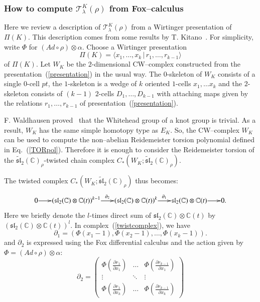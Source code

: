 \documentclass[a4paper]{amsart}
\theoremstyle{plain}
\theoremstyle{definition}
\theoremstyle{remark}
\newcommand{\C}{{\mathbb C}}
\newcommand{\CC}{{\mathbb C}}
\newcommand{\T}{\mathcal{T}}
\newcommand{\sll}{\mathfrak{sl}_2(\CC)}
\newcommand{\tsll}{\widetilde{\mathfrak{sl}}_2(\CC)}
\begin{document}
\subsubsection*{How to compute $\T^K_{\lambda}(\rho)$ from Fox--calculus} 
Here we review a description of $\T^K_{\lambda}(\rho)$ from a Wirtinger presentation of $\Pi(K)$. This description comes from some results by T. Kitano~\cite{Kitano}.
For simplicity, write $\Phi$ for $(Ad \circ \rho) \otimes \alpha$.
Choose a Wirtinger presentation
\begin{equation}\label{presentation}
\Pi(K)
=
\langle x_1, \ldots, x_k \,|\, r_1,\ldots, r_{k-1} \rangle
\end{equation}
of $\Pi(K)$.
Let $W_K$ be the $2$-dimensional CW--complex constructed from the presentation~(\ref{presentation}) in the usual way. The $0$-skeleton of $W_K$ consists of a single $0$-cell $pt$, the $1$-skeleton is a wedge of
$k$ oriented $1$-cells $x_1, \ldots x_k$ and the $2$-skeleton consists of $(k-1)$ $2$-cells $D_1, \ldots, D_{k-1}$ with
attaching maps given by the relations $r_1, \ldots, r_{k-1}$ of presentation~(\ref{presentation}).

 F. Waldhausen proved~\cite{W} that the Whitehead 
group of a knot group is trivial. As a result, $W_K$ has the same simple 
homotopy type as $E_K$. So, the CW--complex $W_K$ can be used to compute  the non--abelian Reidemeister torsion polynomial defined in Eq.~(\ref{TORpol}). 
Therefore it is enough to consider the Reidemeister torsion of the $\tsll_\rho$-twisted chain complex $C_*\left(W_K;\tsll_\rho\right)$.

The twisted complex $C_*(W_K;\tsll_\rho)$ thus becomes:
\begin{equation}\label{twistcomplex}
\xymatrix@1@-.5pc{0 \ar[r] &  {\left({\sll\otimes \C(t)}\right)}_{}^{k-1} 
\ar[r]^-{\partial_2} &  {\left({\sll \otimes \C(t)}\right)}_{}^k 
\ar[r]^-{\partial_1}& \sll \otimes \C(t) \ar[r] & 0.}
\end{equation}
Here we briefly denote the $l$-times direct sum of $\sll \otimes \C(t)$ by $(\sll \otimes \C(t))^l$. In complex~(\ref{twistcomplex}), we have 
\[
\partial_1 
=
\left( {\Phi(x_1 - 1), \Phi(x_2 - 1), \ldots, \Phi(x_k - 1)} \right).
\]
and $\partial_2$ is expressed using the Fox differential calculus and the action given by $\Phi = (Ad \circ \rho) \otimes \alpha$:
\begin{equation}\label{Eq:MatrixD2}
\partial_2 =
\left(
\begin{array}{ccc}
\Phi(\frac{\partial r_1}{\partial x_1}) & \ldots & \Phi(\frac{\partial r_{k-1}}{\partial x_1}) \\
\vdots & \ddots & \vdots \\
\Phi(\frac{\partial r_1}{\partial x_k}) & \ldots & \Phi(\frac{\partial r_{k-1}}{\partial x_k}) 
\end{array}
\right)
\end{equation}
\end{document}
